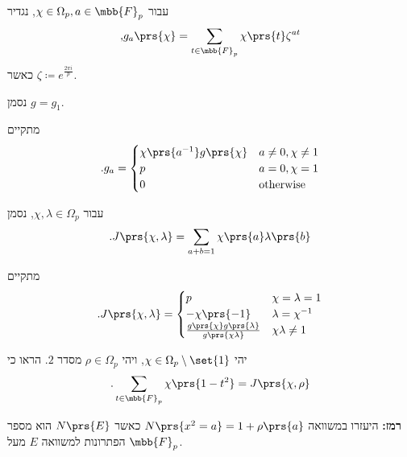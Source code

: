 \documentclass[a4paper,10pt,twoside,openany]{book}
\begin{document}
\begin{definition}
עבור
$\chi \in \Omega_p, a \in \mbb{F}_p$,
נגדיר
\begin{align*}
\text{,} g_a\prs{\chi} = \sum_{t \in \mbb{F}_p} \chi\prs{t} \zeta^{at}
\end{align*}
כאשר
$\zeta \coloneqq e^{\frac{2 \pi i}{p}}$.

נסמן
$g = g_1$.
\end{definition}

\begin{proposition}
מתקיים
\begin{align*}
\text{.} g_a =
\begin{cases}
	\chi\prs{a^{-1}} g\prs{\chi} & a \neq 0, \chi \neq 1 \\
	p & a = 0, \chi = 1 \\
	0 & \text{otherwise}
\end{cases}
\end{align*}
\end{proposition}

\begin{definition}
עבור
$\chi, \lambda \in \Omega_p$,
נסמן
\[\text{.} J\prs{\chi, \lambda} = \sum_{a+b = 1} \chi\prs{a} \lambda\prs{b}\]
\end{definition}

\begin{proposition}
מתקיים
\begin{align*}
\text{.} J\prs{\chi, \lambda} =
\begin{cases}
	p & \chi = \lambda = 1 \\
	-\chi\prs{-1} & \lambda = \chi^{-1} \\
	\frac{g\prs{\chi} g\prs{\lambda}}{g\prs{\chi \lambda}} & \chi \lambda \neq 1
\end{cases}
\end{align*}
\end{proposition}

\begin{exercisechap}
יהי
$\chi \in \Omega_p \setminus \set{1}$,
ויהי
$\rho \in \Omega_p$
מסדר
$2$.
הראו כי
\begin{align*}
\text{.} \sum_{t \in \mbb{F}_p} \chi\prs{1 - t^2} = J\prs{\chi, \rho}
\end{align*}

\textbf{רמז:}
היעזרו במשוואה
$N\prs{x^2 = a} = 1 + \rho\prs{a}$
כאשר
$N\prs{E}$
הוא מספר הפתרונות למשוואה
$E$
מעל
$\mbb{F}_p$.
\end{exercisechap}
\end{document}
